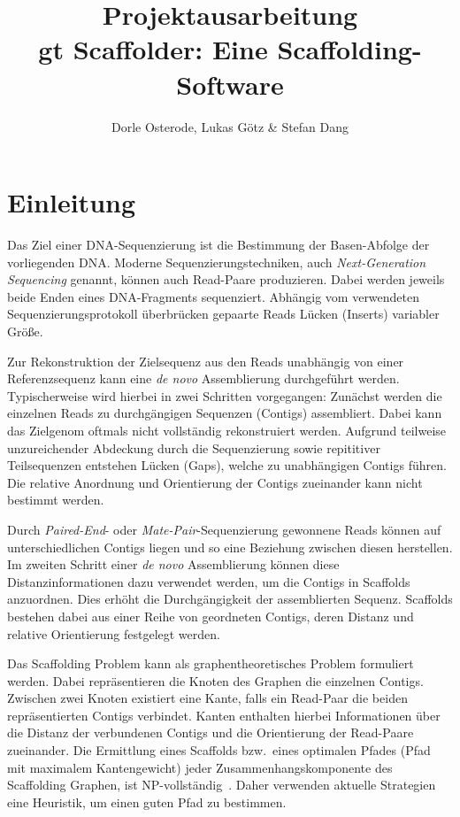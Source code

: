 \documentclass[a4paper,10pt,parskip]{scrartcl}
\title{Projektausarbeitung \\\vspace{.5cm} \large gt Scaffolder: Eine Scaffolding-Software}
\author{Dorle Osterode, Lukas Götz \& Stefan Dang}
\date{}
\begin{document}
\maketitle{}
\thispagestyle{empty}
\begin{abstract}
\end{abstract}

\newpage{}
\thispagestyle{empty}
\tableofcontents{}
\newpage{}
\setcounter{page}{1}
\section{Einleitung}

Das Ziel einer DNA-Sequenzierung ist die Bestimmung der Basen-Abfolge
der vorliegenden DNA. Moderne Sequenzierungstechniken, auch
\textit{Next-Generation Sequencing} genannt, können auch Read-Paare
produzieren. Dabei werden jeweils beide Enden eines DNA-Fragments
sequenziert. Abhängig vom verwendeten Sequenzierungsprotokoll
überbrücken gepaarte Reads Lücken (Inserts) variabler Größe.

Zur Rekonstruktion der Zielsequenz aus den Reads unabhängig von einer
Referenzsequenz kann eine \textit{de novo} Assemblierung durchgeführt
werden. Typischerweise wird hierbei in zwei Schritten vorgegangen:
Zunächst werden die einzelnen Reads zu durchgängigen Sequenzen
(Contigs) assembliert. Dabei kann das Zielgenom oftmals nicht
vollständig rekonstruiert werden. Aufgrund teilweise unzureichender
Abdeckung durch die Sequenzierung sowie repititiver Teilsequenzen
entstehen Lücken (Gaps), welche zu unabhängigen Contigs führen. Die
relative Anordnung und Orientierung der Contigs zueinander kann nicht
bestimmt werden.

Durch \textit{Paired-End}- oder \textit{Mate-Pair}-Sequenzierung
gewonnene Reads können auf unterschiedlichen Contigs liegen und so
eine Beziehung zwischen diesen herstellen. Im zweiten Schritt einer
\textit{de novo} Assemblierung können diese Distanzinformationen dazu
verwendet werden, um die Contigs in Scaffolds anzuordnen. Dies erhöht
die Durchgängigkeit der assemblierten Sequenz. Scaffolds bestehen
dabei aus einer Reihe von geordneten Contigs, deren Distanz und
relative Orientierung festgelegt werden.

Das Scaffolding Problem kann als graphentheoretisches Problem
formuliert werden. Dabei repräsentieren die Knoten des Graphen die
einzelnen Contigs. Zwischen zwei Knoten existiert eine Kante, falls
ein Read-Paar die beiden repräsentierten Contigs verbindet. Kanten
enthalten hierbei Informationen über die Distanz der verbundenen Contigs
und die Orientierung der Read-Paare zueinander. Die Ermittlung eines
Scaffolds bzw.\ eines optimalen Pfades (Pfad mit maximalem Kantengewicht)
jeder Zusammenhangskomponente des Scaffolding Graphen, ist
NP-vollständig~\cite{Huson:2002kf}. Daher verwenden aktuelle
Strategien eine Heuristik, um einen guten Pfad zu
bestimmen.
\end{document}
